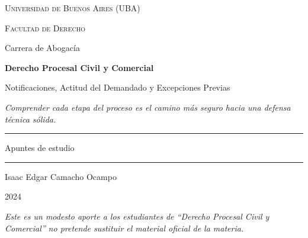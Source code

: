 \documentclass[12pt,oneside]{book}
\newcommand{\universidad}{Universidad de Buenos Aires (UBA)}
\newcommand{\facultad}{Facultad de Derecho}
\newcommand{\carrera}{Carrera de Abogacía}
\newcommand{\materia}{Derecho Procesal Civil y Comercial}
\newcommand{\titulo}{Notificaciones, Actitud del Demandado y Excepciones Previas}
\newcommand{\autor}{Isaac Edgar Camacho Ocampo}
\newcommand{\anio}{2024}
\begin{document}
\begin{titlepage}

\thispagestyle{empty}

\begin{center}

\vspace*{1cm}

{\large \textsc{\universidad}}

\vspace{0.2cm}

{\large \textsc{\facultad}}

\vspace{0.2cm}

{\large \carrera}

\vspace{3cm}

{\Huge \textbf{\materia}}

\vspace{1cm}

{\LARGE \titulo}

\vspace{0.8cm}

\textit{Comprender cada etapa del proceso es el camino más seguro hacia una defensa técnica sólida.}

\vspace{1.2cm}

\rule{0.70\textwidth}{0.5pt}

\vspace{0.5cm}

{\large Apuntes de estudio}

\vspace{0.5cm}

\rule{0.70\textwidth}{0.5pt}

\vfill

{\large \autor}

\vspace{0.3cm}

{\large \anio}

\end{center}

\vfill

\begin{flushleft}
\textit{Este es un modesto aporte a los estudiantes de ``Derecho Procesal Civil y Comercial'' no pretende sustituir el material oficial de la materia.}
\end{flushleft}

\end{titlepage}
\end{document}
